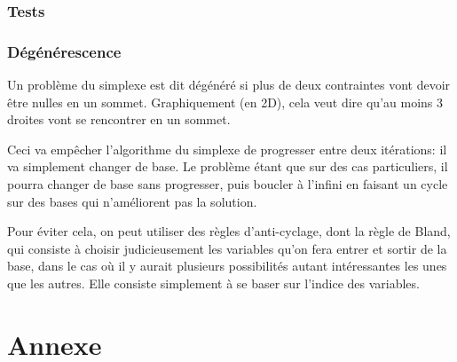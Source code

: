 \documentclass{scrartcl}
\begin{document}
    \subsubsection{Tests}
      
    \subsubsection{Dégénérescence}
      Un problème du simplexe est dit dégénéré si plus de deux contraintes vont
      devoir être nulles en un sommet. Graphiquement (en 2D), cela veut dire
      qu'au moins 3 droites vont se rencontrer en un sommet.

      Ceci va empêcher l'algorithme du simplexe de progresser entre deux
      itérations: il va simplement changer de base. Le problème étant que sur
      des cas particuliers, il pourra changer de base sans progresser, puis
      boucler à l'infini en faisant un cycle sur des bases qui n'améliorent pas
      la solution.

      Pour éviter cela, on peut utiliser des règles d'anti-cyclage, dont la
      règle de Bland, qui consiste à choisir judicieusement les variables qu'on
      fera entrer et sortir de la base, dans le cas où il y aurait plusieurs
      possibilités autant intéressantes les unes que les autres. Elle consiste
      simplement à se baser sur l'indice des variables. %

\section{Annexe}
  \lstlistoflistings
  
  
  
\end{document}
